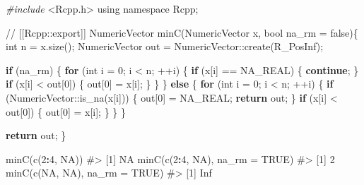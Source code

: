 \documentclass[
]{krantz}
\makeatletter
\newenvironment{Shaded}{\begin{snugshade}}{\end{snugshade}}
\newcommand{\CommentTok}[1]{\textcolor[rgb]{0.56,0.35,0.01}{\textit{#1}}}
\newcommand{\ControlFlowTok}[1]{\textcolor[rgb]{0.13,0.29,0.53}{\textbf{#1}}}
\newcommand{\DataTypeTok}[1]{\textcolor[rgb]{0.13,0.29,0.53}{#1}}
\newcommand{\DecValTok}[1]{\textcolor[rgb]{0.00,0.00,0.81}{#1}}
\newcommand{\ImportTok}[1]{#1}
\newcommand{\KeywordTok}[1]{\textcolor[rgb]{0.13,0.29,0.53}{\textbf{#1}}}
\newcommand{\NormalTok}[1]{#1}
\newcommand{\OperatorTok}[1]{\textcolor[rgb]{0.81,0.36,0.00}{\textbf{#1}}}
\newcommand{\OtherTok}[1]{\textcolor[rgb]{0.56,0.35,0.01}{#1}}
\newcommand{\PreprocessorTok}[1]{\textcolor[rgb]{0.56,0.35,0.01}{\textit{#1}}}
\newenvironment{kframe}{%
\medskip{}
\setlength{\fboxsep}{.8em}
 \def\at@end@of@kframe{}%
 \ifinner\ifhmode%
  \def\at@end@of@kframe{\end{minipage}}%
  \begin{minipage}{\columnwidth}%
 \fi\fi%
 \def\FrameCommand##1{\hskip\@totalleftmargin \hskip-\fboxsep
 \colorbox{shadecolor}{##1}\hskip-\fboxsep
     \hskip-\linewidth \hskip-\@totalleftmargin \hskip\columnwidth}%
 \MakeFramed {\advance\hsize-\width
   \@totalleftmargin\z@ \linewidth\hsize
   \@setminipage}}%
 {\par\unskip\endMakeFramed%
 \at@end@of@kframe}
\renewenvironment{Shaded}{\begin{kframe}}{\end{kframe}}
\renewcommand{\KeywordTok} [1]{\textcolor[rgb]{0.00,0.44,0.13}{{#1}}}
\renewcommand{\DataTypeTok}[1]{\textcolor[rgb]{0.56,0.13,0.00}{{#1}}}
\renewcommand{\DecValTok}  [1]{\textcolor[rgb]{0.25,0.63,0.44}{{#1}}}
\renewcommand{\CommentTok} [1]{\textcolor[rgb]{0.38,0.63,0.69}{{#1}}}
\renewcommand{\OtherTok}   [1]{\textcolor[rgb]{0.00,0.44,0.13}{{#1}}}
\renewcommand{\NormalTok}  [1]{{#1}}
\makeatother
\begin{document}
\begin{Shaded}
\begin{Highlighting}[]
\PreprocessorTok{#include }\ImportTok{<Rcpp.h>}
\KeywordTok{using} \KeywordTok{namespace}\NormalTok{ Rcpp;}

\CommentTok{// [[Rcpp::export]]}
\NormalTok{NumericVector minC(NumericVector x, }\DataTypeTok{bool}\NormalTok{ na_rm = }\KeywordTok{false}\NormalTok{)\{}
  \DataTypeTok{int}\NormalTok{ n = x.size();}
\NormalTok{  NumericVector out = NumericVector::create(R_PosInf);}
  
  \ControlFlowTok{if}\NormalTok{ (na_rm) \{}
    \ControlFlowTok{for}\NormalTok{ (}\DataTypeTok{int}\NormalTok{ i = }\DecValTok{0}\NormalTok{; i < n; ++i) \{}
      \ControlFlowTok{if}\NormalTok{ (x[i] == NA_REAL) \{}
        \ControlFlowTok{continue}\NormalTok{;}
\NormalTok{      \}}
      \ControlFlowTok{if}\NormalTok{ (x[i] < out[}\DecValTok{0}\NormalTok{]) \{}
\NormalTok{        out[}\DecValTok{0}\NormalTok{] = x[i];}
\NormalTok{      \}}
\NormalTok{    \}}
\NormalTok{  \} }\ControlFlowTok{else}\NormalTok{ \{}
    \ControlFlowTok{for}\NormalTok{ (}\DataTypeTok{int}\NormalTok{ i = }\DecValTok{0}\NormalTok{; i < n; ++i) \{}
      \ControlFlowTok{if}\NormalTok{ (NumericVector::is_na(x[i])) \{}
\NormalTok{        out[}\DecValTok{0}\NormalTok{] = NA_REAL;}
        \ControlFlowTok{return}\NormalTok{ out;}
\NormalTok{      \}}
      \ControlFlowTok{if}\NormalTok{ (x[i] < out[}\DecValTok{0}\NormalTok{]) \{}
\NormalTok{        out[}\DecValTok{0}\NormalTok{] = x[i];}
\NormalTok{      \}}
\NormalTok{    \}}
\NormalTok{  \}}
  
  \ControlFlowTok{return}\NormalTok{ out;}
\NormalTok{\}}
\end{Highlighting}
\end{Shaded}

\begin{Shaded}
\begin{Highlighting}[]
\KeywordTok{minC}\NormalTok{(}\KeywordTok{c}\NormalTok{(}\DecValTok{2}\OperatorTok{:}\DecValTok{4}\NormalTok{, }\OtherTok{NA}\NormalTok{))}
\CommentTok{#> [1] NA}
\KeywordTok{minC}\NormalTok{(}\KeywordTok{c}\NormalTok{(}\DecValTok{2}\OperatorTok{:}\DecValTok{4}\NormalTok{, }\OtherTok{NA}\NormalTok{), }\DataTypeTok{na_rm =} \OtherTok{TRUE}\NormalTok{)}
\CommentTok{#> [1] 2}
\KeywordTok{minC}\NormalTok{(}\KeywordTok{c}\NormalTok{(}\OtherTok{NA}\NormalTok{, }\OtherTok{NA}\NormalTok{), }\DataTypeTok{na_rm =} \OtherTok{TRUE}\NormalTok{)}
\CommentTok{#> [1] Inf}
\end{Highlighting}
\end{Shaded}
\end{document}
